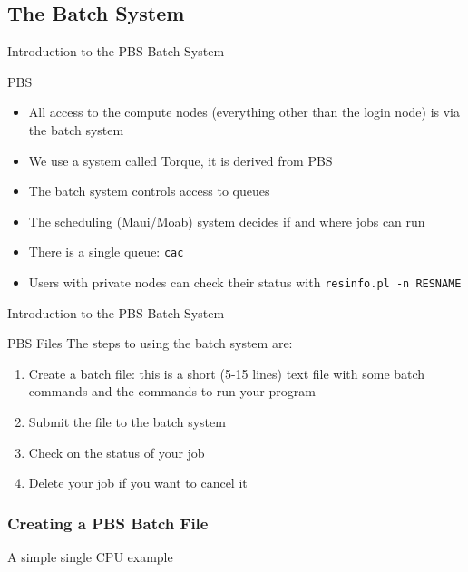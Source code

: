 \documentclass[handout]{beamer}
\begin{document}
  \subsection{The Batch System}
  \begin{frame}{Introduction to the PBS Batch System}
   \begin{block}{PBS}
    \begin{itemize}
    \item All access to the compute nodes (everything other than the login node)
      is via the batch system
    \item We use a system called Torque, it is derived from PBS
    \item The batch system controls access to queues
    \item The scheduling (Maui/Moab) system decides if and where jobs can run
    \item<2-> There is a single queue: \texttt{cac}
    \item<3-> Users with private nodes can check their status with \texttt{resinfo.pl -n RESNAME}
    \end{itemize}
   \end{block}
  \end{frame}
  \begin{frame}{Introduction to the PBS Batch System}
   \begin{block}{PBS Files}
    The steps to using the batch system are:
    \begin{enumerate}
    \item Create a batch file: this is a short (5-15 lines) text file with some
      batch commands and the commands to run your program
    \item Submit the file to the batch system
    \item Check on the status of your job
    \item Delete your job if you want to cancel it
    \end{enumerate}
   \end{block}
  \end{frame}
\begin{frame}[fragile]
  \frametitle{Creating a PBS Batch File}
A simple single CPU example
  \begin{semiverbatim}
  \end{semiverbatim}
\end{frame}
\end{document}
